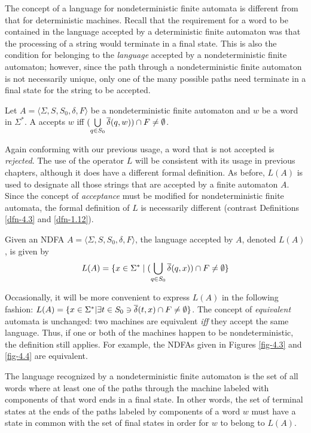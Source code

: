 The concept of a language for nondeterministic finite automata is different
from that for deterministic machines. Recall that the requirement for a word
to be contained in the language accepted by a deterministic finite automaton was
that the processing of a string would terminate in a final state. This is also
the condition for belonging to the \emph{language} accepted by a
nondeterministic finite automaton; however, since the path through a
nondeterministic finite automaton is not necessarily unique, only one of the
many possible paths need terminate in a final state for the string to be
accepted.

\begin{dfn}\label{dfn-4.3}
Let $A=\langle\Sigma,S,S_0,\delta,F\rangle$ be a nondeterministic finite
automaton and $w$ be a word in $\Sigma^*$. A accepts $w$ iff 
$(\bigcup\limits_{q\in S_0}\overline{\delta}(q,w)) \cap F \not= \emptyset$.
\end{dfn}

Again conforming with our previous usage, a word that is not accepted is
\emph{rejected}. The use of the operator $L$ will be consistent with its usage in
previous chapters, although it does have a different formal definition. As
before, $L(A)$ is used to designate all those strings that are accepted by a
finite automaton $A$. Since the concept of \emph{acceptance} must be modified
for nondeterministic finite automata, the formal definition of $L$ is
necessarily different (contrast Definitions \ref{dfn-4.3} and \ref{dfn-1.12}).

\begin{dfn}\label{dfn-4.4}
Given an NDFA $A=\langle\Sigma,S,S_0,\delta,F\rangle$, the language accepted
by $A$, denoted $L(A)$, is given by
\[L(A) = \{x \in \Sigma^* \mid (\bigcup\limits_{q\in S_0}
\overline{\delta}(q,x)) \cap F \not= \emptyset\}\]
\end{dfn}

Occasionally, it will be more convenient to express $L(A)$ in the following
fashion: $L(A) = \{x \in \Sigma^*|\exists t \in S_0 \ni \overline{\delta}(t,x) \cap F \not=
\emptyset\}$. The concept of \emph{equivalent} automata is unchanged: two
machines are equivalent \emph{iff} they accept the same language. Thus, if one
or both of the machines happen to be nondeterministic, the definition still
applies. For example, the NDFAs given in Figures \ref{fig-4.3} and \ref{fig-4.4} are equivalent.

The language recognized by a nondeterministic finite automaton is the set of
all words where at least one of the paths through the machine labeled with
components of that word ends in a final state. In other words, the set of
terminal states at the ends of the paths labeled by components of a word $w$
must have a state in common with the set of final states in order for $w$ to
belong to $L(A)$.

